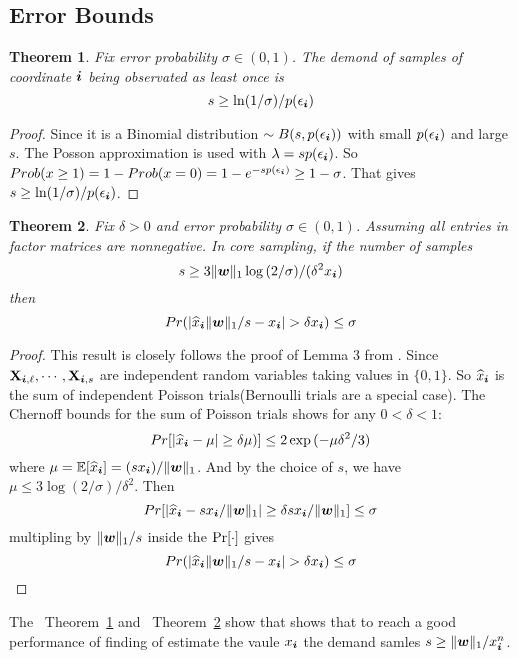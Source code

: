 \documentclass[letterpaper]{article}
\newcommand{\V}[1]{{\bm{{\MakeLowercase{#1}}}}}
\newcommand{\M}[1]{{\bm{\mathbf{\MakeUppercase{#1}}}}}
\newcommand{\norm}[2]{\|#1\|_{#2}}
\newcommand{\Theo}[1] {Theorem~\ref{theo:#1}}
\newcommand{\predx}{\widehat{x}_{\V{i}}}
\newtheorem{theorem}{Theorem}
\begin{document}
\subsection{Error Bounds}
\begin{theorem}\label{theo:ObservationBound}
Fix error probability $\sigma \in (0,1)$.
The demond of samples of coordinate $\V{i}$ being observated as least once is
\[
    s \geq \ln(1/\sigma)/p(\epsilon_{\V{i}})
\]
\end{theorem}
\begin{proof}
Since it is a Binomial distribution  $\sim B(s,p(\epsilon_{\V{i}}))$ with
small $p(\epsilon_{\V{i}})$ and large $s$.
The Posson approximation is used with $\lambda = sp(\epsilon_{\V{i}})$.
So $Prob(x\geq1)=1-Prob(x=0)=1-e^{-sp(\epsilon_{\V{i}})} \geq 1-\sigma$.
That gives $s \geq \ln(1/\sigma)/p(\epsilon_{\V{i}})$.
\end{proof}

\begin{theorem}\label{theo:Bound}
Fix $\delta > 0$ and error probability $\sigma \in (0,1)$.
Assuming all entries in factor matrices are nonnegative.
In core sampling, if the number of samples
\[
    s \geq 3\norm{\V{w}}{1}\log{(2/\sigma)}/(\delta^2 x_{\V{i}})
\]
then
\[
    Pr(|\predx\norm{\V{W}}{1}/s - x_{\V{i}}| > \delta x_{\V{i}}) \leq \sigma
\]
\end{theorem}

\begin{proof}
This result is closely follows the proof of Lemma 3 from \cite{BaPiKoSe15}.
Since  $ \M{X}_{\V{i},\ell},\cdots,\M{X}_{\V{i},s} $
are independent random variables taking values in $\{0,1\}$.
So $\predx$ is the sum of independent Poisson trials(Bernoulli trials are a special case).
The Chernoff bounds for the sum of Poisson trials shows for any $0 <\delta <1 $:
\[
    Pr[|\predx - \mu|\geq\delta\mu)] \leq 2\exp{(-\mu\delta^2/3)}
\]
where $\mu=\mathbb{E}[\predx]=(sx_{\V{i}})/\norm{\V{W}}{1}$.
And by the choice of $s$, we have
$\mu\leq 3\log{(2/\sigma)/\delta^2}$.
Then
\[
    Pr[|\predx-sx_{\V{i}}/\norm{\V{W}}{1}|\geq\delta sx_{\V{i}}/\norm{\V{W}}{1}] \leq \sigma
\]
multipling by $\norm{\V{W}}{1}/s$ inside the ${\rm Pr}[\cdot]$ gives
\[
    Pr(|\predx\norm{\V{W}}{1}/s - x_{\V{i}}| > \delta x_{\V{i}}) \leq \sigma
\]
\end{proof}
The ~\Theo{ObservationBound} and ~\Theo{Bound} show that shows that
to reach a good performance of finding of estimate the vaule $x_{\V{i}}$
the demand samles $s\geq \norm{\V{w}}{1}/x_{\V{i}}^n$.
\end{document}
